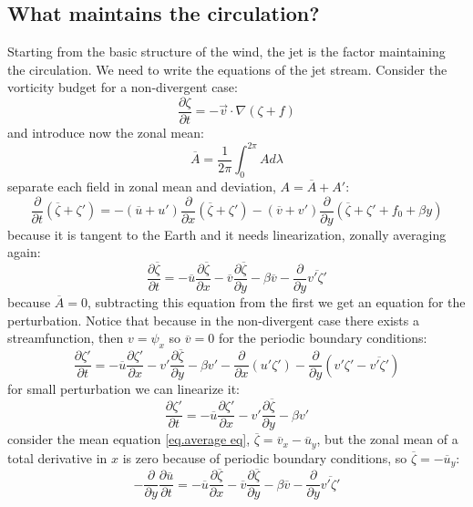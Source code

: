 \subsection{What maintains the circulation?} Starting from the basic structure of the wind, the jet is the factor maintaining the circulation. We need to write the equations of the jet stream. Consider the vorticity budget for a non-divergent case:
\begin{equation}
	\frac{\partial\zeta}{\partial t}=-\vec{v}\cdot\nabla(\zeta+f)
\end{equation}
and introduce now the zonal mean:
\begin{equation}\label{eq.zonal mean}
	\overline{A}=\frac{1}{2\pi}\int_0^{2\pi}Ad\lambda
\end{equation}
separate each field in zonal mean and deviation, $A=\overline{A}+A'$:
$$\frac{\partial}{\partial t}(\overline{\zeta}+\zeta')=-(\overline{u}+u')\frac{\partial}{\partial x}(\overline{\zeta}+\zeta')-(\overline{v}+v')\frac{\partial}{\partial y}(\overline{\zeta}+\zeta'+f_0+\beta y)$$
because it is tangent to the Earth and it needs linearization, zonally averaging again:
\begin{equation}\label{eq.average eq}
	\frac{\partial\overline{\zeta}}{\partial t}=-\overline{u}\frac{
		\partial\overline{\zeta}
	}{\partial x}-\overline{v}\frac{\partial\overline{\zeta}}{\partial y}-\beta \overline{v}-\frac{\partial}{\partial y}\overline{v'\zeta'}
\end{equation}
because $\overline{A}=0$, subtracting this equation from the first we get an equation for the perturbation. Notice that because in the non-divergent case there exists a streamfunction, then $v=\psi_x$ so $\overline{v}=0$ for the periodic boundary conditions:
$$\frac{\partial\zeta'}{\partial t}=-\overline{u}\frac{\partial\zeta'}{\partial x}-v'\frac{\partial\overline{\zeta}}{\partial y}-\beta v'-\frac{\partial}{\partial x}(u'\zeta')-\frac{\partial}{\partial y}(v'\zeta'-\overline{v'\zeta'})$$ for small perturbation we can linearize it:
\begin{equation}
	\frac{\partial\zeta'}{\partial t}=-\overline{u}\frac{\partial\zeta'}{\partial x}-v'\frac{\partial\overline{\zeta}}{\partial y}-\beta v'
\end{equation}
consider the mean equation \ref{eq.average eq}, $\overline{\zeta}=\overline{v}_x-\overline{u}_y$, but the zonal mean of a total derivative in $x$ is zero because of periodic boundary conditions, so $\overline{\zeta}=-\overline{u}_y$:
$$-\frac{\partial}{\partial y}\frac{\partial\overline{u}}{\partial t}=-\overline{u}\frac{\partial\overline{\zeta}}{\partial x}-\overline{v}\frac{\partial\overline{\zeta}}{\partial y}-\beta\overline{v}-\frac{\partial}{\partial y}\overline{v'\zeta'}$$
